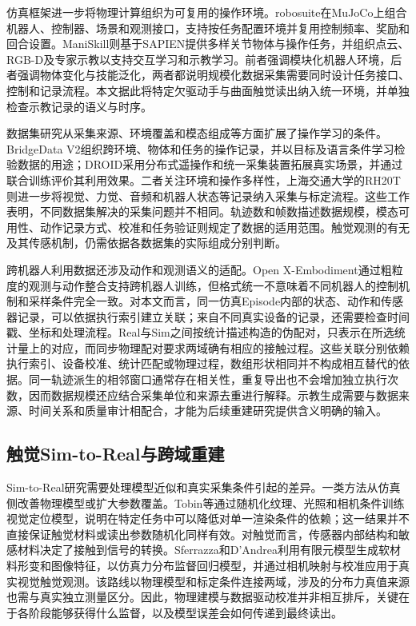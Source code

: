 仿真框架进一步将物理计算组织为可复用的操作环境。robosuite在MuJoCo上组合机器人、控制器、场景和观测接口，支持按任务配置环境并复用控制频率、奖励和回合设置\cite{zhu2020robosuite}。ManiSkill则基于SAPIEN提供多样关节物体与操作任务，并组织点云、RGB-D及专家示教以支持交互学习和示教学习\cite{mu2021maniskill}。前者强调模块化机器人环境，后者强调物体变化与技能泛化，两者都说明规模化数据采集需要同时设计任务接口、控制和记录流程。本文据此将特定欠驱动手与曲面触觉读出纳入统一环境，并单独检查示教记录的语义与时序。

数据集研究从采集来源、环境覆盖和模态组成等方面扩展了操作学习的条件。BridgeData V2组织跨环境、物体和任务的操作记录，并以目标及语言条件学习检验数据的用途\cite{walke2023bridgedata}；DROID采用分布式遥操作和统一采集装置拓展真实场景，并通过联合训练评价其利用效果\cite{khazatsky2024droid}。二者关注环境和操作多样性，上海交通大学的RH20T则进一步将视觉、力觉、音频和机器人状态等记录纳入采集与标定流程\cite{fang2024rh20t}。这些工作表明，不同数据集解决的采集问题并不相同。轨迹数和帧数描述数据规模，模态可用性、动作记录方式、校准和任务验证则规定了数据的适用范围。触觉观测的有无及其传感机制，仍需依据各数据集的实际组成分别判断。

跨机器人利用数据还涉及动作和观测语义的适配。Open X-Embodiment通过粗粒度的观测与动作整合支持跨机器人训练，但格式统一不意味着不同机器人的控制机制和采样条件完全一致\cite{openx2024embodiment}。对本文而言，同一仿真Episode内部的状态、动作和传感器记录，可以依据执行索引建立关联；来自不同真实设备的记录，还需要检查时间戳、坐标和处理流程。Real与Sim之间按统计描述构造的伪配对，只表示在所选统计量上的对应，而同步物理配对要求两域确有相应的接触过程。这些关联分别依赖执行索引、设备校准、统计匹配或物理过程，数组形状相同并不构成相互替代的依据。同一轨迹派生的相邻窗口通常存在相关性，重复导出也不会增加独立执行次数，因而数据规模还应结合采集单位和来源去重进行解释。示教生成需要与数据来源、时间关系和质量审计相配合，才能为后续重建研究提供含义明确的输入。

\subsection{触觉Sim-to-Real与跨域重建}
\label{subsec:tactile_sim_to_real}

Sim-to-Real研究需要处理模型近似和真实采集条件引起的差异。一类方法从仿真侧改善物理模型或扩大参数覆盖。Tobin等通过随机化纹理、光照和相机条件训练视觉定位模型，说明在特定任务中可以降低对单一渲染条件的依赖\cite{tobin2017randomization}；这一结果并不直接保证触觉材料或读出参数随机化同样有效。对触觉而言，传感器内部结构和敏感材料决定了接触到信号的转换。Sferrazza和D'Andrea利用有限元模型生成软材料形变和图像特征，以仿真力分布监督回归模型，并通过相机映射与校准应用于真实视觉触觉观测\cite{sferrazza2022simtoreal}。该路线以物理模型和标定条件连接两域，涉及的分布力真值来源也需与真实独立测量区分。因此，物理建模与数据驱动校准并非相互排斥，关键在于各阶段能够获得什么监督，以及模型误差会如何传递到最终读出。

